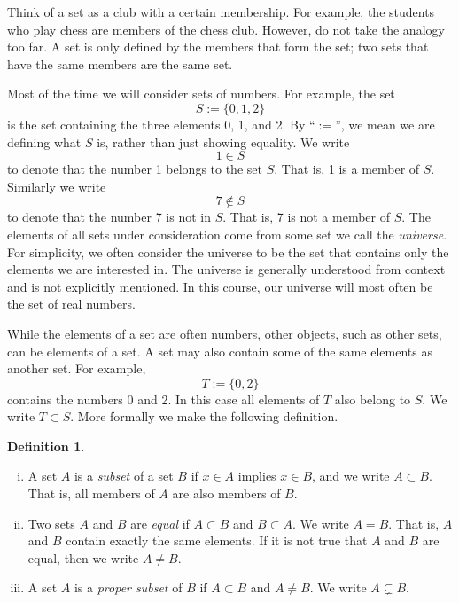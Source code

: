 \documentclass[12pt]{book}
\newcommand{\myindex}[1]{#1\index{#1}}
\theoremstyle{plain}
\theoremstyle{remark}
\theoremstyle{definition}
\newtheorem{defn}[thm]{Definition}
\theoremstyle{exercise}
\theoremstyle{example}
\begin{document}
Think of a set as a club with a certain membership.  For
example, the students who play chess are members of the chess club.  However,
do not take the analogy too far.  A set is only defined by the members
that form the set; two sets that have the same members are the same set.

Most of the time we will consider sets
of numbers.  For example, the set
\begin{equation*}
S := \{ 0, 1, 2 \}
\end{equation*}
is the set containing
the three elements 0, 1, and 2.
By ``$:=$'', we mean we are defining what $S$ is, rather than
just showing equality.
We write
\begin{equation*}
1 \in S
\end{equation*}
to denote that the number 1 belongs to the set $S$.  That is, 1 is a member
of $S$.  Similarly we write
\begin{equation*}
7 \notin S
\end{equation*}
to denote that the number 7 is not in $S$.  That is, 7 is not a member of
$S$.
The elements of all sets under consideration come from some set we call the
\emph{\myindex{universe}}.  For simplicity,
we often consider the universe to be the set that contains only the elements
we are interested in.
The universe is generally understood from context
and is not explicitly mentioned.  In this course, our universe will
most often be the set of real numbers.

While the elements of a set are often numbers,
other objects, such as other sets, can be elements of a set.
A set may also contain some of the same elements as another set.  For example,
\begin{equation*}
T := \{ 0, 2 \}
\end{equation*}
contains the numbers 0 and 2.  In this case all elements of $T$ also
belong to $S$.  We write $T \subset S$.  More formally we make the
following definition.

\begin{defn}
{\ }
\begin{enumerate}[(i)]
\item
A set $A$ is a \emph{\myindex{subset}}
of a set $B$ if $x \in A$ implies $x \in B$, and we write $A \subset B$.
That is, all members of $A$ are also members of $B$.
\item
Two sets $A$ and $B$ are \emph{\myindex{equal}} if $A \subset B$ and $B
\subset A$.  We write $A = B$.
That is, $A$ and $B$ contain exactly the same elements.
If it is not true that $A$ and $B$ are equal, then 
we write $A \not= B$.
\item
A set $A$ is a \emph{\myindex{proper subset}} of $B$ if $A \subset B$
and $A \not= B$.  We write $A \subsetneq B$.
\end{enumerate}
\end{defn}
\end{document}
